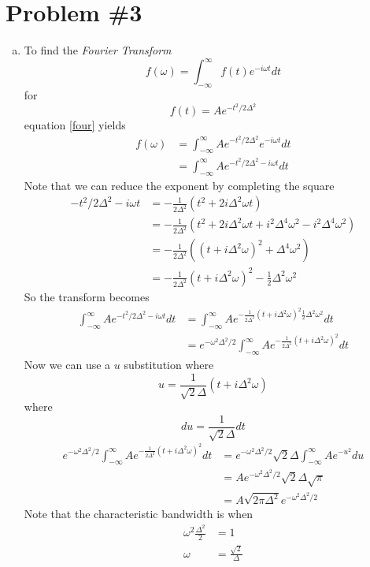 \documentclass[11pt]{article}
\numberwithin{equation}{section}
\begin{document}
\section{Problem \#3}
\begin{enumerate}[(a)]
\item
To find the \emph{Fourier Transform}
\begin{equation}
f(\omega) = \int_{-\infty}^{\infty}f(t)e^{-i\omega t}dt
\label{four}
\end{equation}
for 
$$f(t) = Ae^{-t^2/2\Delta^2}$$
equation \ref{four} yields
\begin{align*}
f(\omega) &= \int_{-\infty}^{\infty}Ae^{-t^2/2\Delta^2}e^{-i\omega t}dt\\
&= \int_{-\infty}^{\infty}Ae^{-t^2/2\Delta^2-i\omega t}dt
\end{align*}
Note that we can reduce the exponent by completing the square
\begin{align*}
-t^2/2\Delta^2-i\omega t &= -\frac{1}{2\Delta^2}\left(t^2+2i\Delta^2\omega t\right)\\
&= -\frac{1}{2\Delta^2}\left(t^2+2i\Delta^2\omega t + i^2\Delta^4\omega^2 - i^2\Delta^4\omega^2\right)\\
&= -\frac{1}{2\Delta^2}\left((t+i\Delta^2\omega)^2 + \Delta^4\omega^2\right)\\
&= -\frac{1}{2\Delta^2}(t+i\Delta^2\omega)^2 - \frac{1}{2}\Delta^2\omega^2
\end{align*}
So the transform becomes
\begin{align*}
\int_{-\infty}^{\infty}Ae^{-t^2/2\Delta^2-i\omega t}dt &= \int_{-\infty}^{\infty}Ae^{-\frac{1}{2\Delta^2}(t+i\Delta^2\omega)^2  \frac{1}{2}\Delta^2\omega^2}dt\\
&= e^{-\omega^2\Delta^2/2}\int_{-\infty}^{\infty}Ae^{-\frac{1}{2\Delta^2}(t+i\Delta^2\omega)^2}dt
\end{align*}
Now we can use a $u$ substitution where
$$u = \frac{1}{\sqrt{2}\Delta}(t+i\Delta^2\omega)$$
where
$$du = \frac{1}{\sqrt{2}\Delta}dt$$
\begin{align*}
e^{-\omega^2\Delta^2/2}\int_{-\infty}^{\infty}Ae^{-\frac{1}{2\Delta^2}(t+i\Delta^2\omega)^2}dt &= e^{-\omega^2\Delta^2/2}\sqrt{2}{\Delta}\int_{-\infty}^{\infty}Ae^{-u^2}du\\
&= Ae^{-\omega^2\Delta^2/2}\sqrt{2}{\Delta}\sqrt{\pi}\\
&= A\sqrt{2\pi\Delta^2}e^{-\omega^2\Delta^2/2}
\end{align*}
Note that the characteristic bandwidth is when
\begin{align*}
\omega^2\frac{\Delta^2}{2} &= 1\\
\omega &= \frac{\sqrt{2}}{\Delta}
\end{align*}


\end{enumerate}
\end{document}
